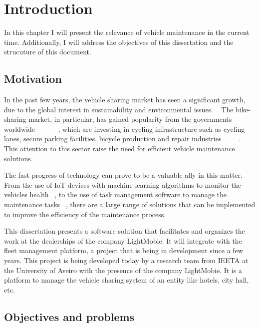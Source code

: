 \chapter{Introduction}%
\label{chapter:introduction}

\begin{introduction}
In this chapter I will present the relevance of vehicle maintenance in the current time. Additionally, I will address the objectives of this dissertation and the strucuture of this document.
\end{introduction} 


\section{Motivation}

In the past few years, the vehicle sharing market has seen a significant growth, due to the global interest in sustainability and environmental issues. ~\cite{bike_data_businessresearch}
The bike-sharing market, in particular, has gained popularity from the governments worldwide ~\cite{Clercq2023} ~\cite{Cerro2024} ~\cite{European_declararion_on_cycling} ~\cite{cohesionOpenData}, which are investing in cycling infrastructure such as cycling lanes, secure parking facilities, bicycle production and repair industries ~\cite{Cerro2024} ~\cite{European_declararion_on_cycling} ~\cite{cohesionOpenData}.
This attention to this sector raise the need for efficient vehicle maintenance solutions.

The fast progress of technology can prove to be a valuable ally in this matter. 
From the use of IoT devices with machine learning algorithms to monitor the vehicles health ~\cite{Vasavi2021}, 
to the use of task management software to manage the maintenance tasks ~\cite{MAS_MOTORS}, 
there are a large range of solutions that can be implemented to improve the efficiency of the maintenance process.

This dissertation presents a software solution that facilitates and organizes the work at the dealerships of the company LightMobie. 
It will integrate with the fleet management platform, a project that is being in development since a few years. 
This project is being developed today by a research team from  \ac{IEETA} at the University of Aveiro with the presence of the company LightMobie.
It is a platform to manage the vehicle sharing system of an entity like hotels, city hall, etc.  

\section{Objectives and problems}

